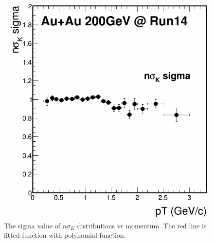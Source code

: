 \begin{figure}[htbp]
\begin{minipage}[htbp]{0.5\linewidth}
\includegraphics[width=1.0\textwidth]{figure/Run14_D0HFT/nSigKaon_sigma.png}
\caption{The sigma value of $n\sigma_{K}$ distributions vs momentum. The red line is fitted function with polynomial function. \label{fig:kaonsigma}}
\end{minipage}
\end{figure}

